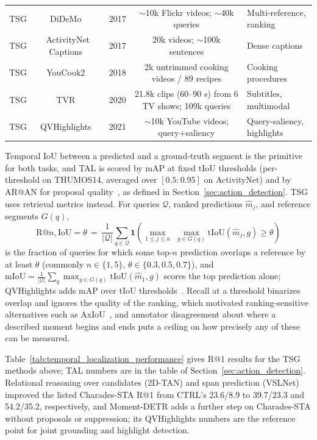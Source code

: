 \begin{table}[t]
\begin{tabularx}{\linewidth}{@{}l c c c X@{}}
TSG & DiDeMo~\cite{hendricks2017mcn} & 2017 & $\sim$10k Flickr videos; $\sim$40k queries & Multi-reference, ranking \\
TSG & ActivityNet Captions~\cite{krishna2017densecap} & 2017 & 20k videos; $\sim$100k sentences & Dense captions \\
TSG & YouCook2~\cite{zhou2017youcook2} & 2018 & 2k untrimmed cooking videos / 89 recipes & Cooking procedures \\
TSG & TVR~\cite{lei2020tvr} & 2020 & 21.8k clips (60--90 s) from 6 TV shows; 109k queries & Subtitles, multimodal \\
TSG & QVHighlights~\cite{lei2021qvhighlights} & 2021 & $\sim$10k YouTube videos; query+saliency & Query-saliency, highlights \\
\bottomrule
\end{tabularx}
\end{table}

Temporal IoU between a predicted and a ground-truth segment is the primitive for both tasks, and TAL is scored by mAP at fixed tIoU thresholds (per-threshold on THUMOS14, averaged over $[0.5{:}0.95]$ on ActivityNet) and by AR@AN for proposal quality~\cite{anet2019proposals}, as defined in Section~\ref{sec:action_detection}. TSG uses retrieval metrics instead. For queries $\mathcal{Q}$, ranked predictions $\hat{m}_j$, and reference segments $G(q)$,
\begin{equation}
\mathrm{R}@n,\mathrm{IoU}{=}\theta \,=\, \frac{1}{|\mathcal{Q}|}\sum_{q\in\mathcal{Q}} \mathbf{1}\!\left(\max_{1\le j\le n}\;\max_{g\in G(q)} \mathrm{tIoU}(\hat{m}_j,g)\ge \theta\right)
\end{equation}
is the fraction of queries for which some top-$n$ prediction overlaps a reference by at least $\theta$ (commonly $n\in\{1,5\}$, $\theta\in\{0.3,0.5,0.7\}$), and $\mathrm{mIoU} = \frac{1}{|\mathcal{Q}|}\sum_{q} \max_{g\in G(q)} \mathrm{tIoU}(\hat{m}_1,g)$ scores the top prediction alone; QVHighlights adds mAP over tIoU thresholds~\cite{lei2021qvhighlights}. Recall at a threshold binarizes overlap and ignores the quality of the ranking, which motivated ranking-sensitive alternatives such as AxIoU~\cite{togashi2022axiou}, and annotator disagreement about where a described moment begins and ends puts a ceiling on how precisely any of these can be measured.

Table~\ref{tab:temporal_localization_performance} gives R@1 results for the TSG methods above; TAL numbers are in the table of Section~\ref{sec:action_detection}. Relational reasoning over candidates (2D-TAN) and span prediction (VSLNet) improved the listed Charades-STA R@1 from CTRL's 23.6/8.9 to 39.7/23.3 and 54.2/35.2, respectively, and Moment-DETR adds a further step on Charades-STA without proposals or suppression; its QVHighlights numbers are the reference point for joint grounding and highlight detection.

